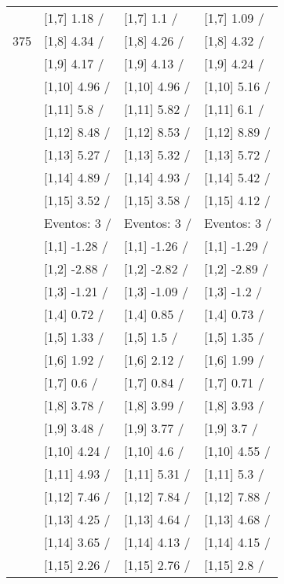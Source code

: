 \begin{table}
\begin{tabular}[t]{llll}
 & {}[1,7] 1.18  / & {}[1,7] 1.1  / & {}[1,7] 1.09  /\\
375 & {}[1,8] 4.34  / & {}[1,8] 4.26  / & {}[1,8] 4.32  /\\
\addlinespace
 & {}[1,9] 4.17  / & {}[1,9] 4.13  / & {}[1,9] 4.24  /\\
 & {}[1,10] 4.96  / & {}[1,10] 4.96  / & {}[1,10] 5.16  /\\
 & {}[1,11] 5.8  / & {}[1,11] 5.82  / & {}[1,11] 6.1  /\\
 & {}[1,12] 8.48  / & {}[1,12] 8.53  / & {}[1,12] 8.89  /\\
 & {}[1,13] 5.27  / & {}[1,13] 5.32  / & {}[1,13] 5.72  /\\
\addlinespace
 & {}[1,14] 4.89  / & {}[1,14] 4.93  / & {}[1,14] 5.42  /\\
 & {}[1,15] 3.52  / & {}[1,15] 3.58  / & {}[1,15] 4.12  /\\
 & Eventos:  3 / & Eventos:  3 / & Eventos:  3 /\\
 & {}[1,1] -1.28  / & {}[1,1] -1.26  / & {}[1,1] -1.29  /\\
 & {}[1,2] -2.88  / & {}[1,2] -2.82  / & {}[1,2] -2.89  /\\
\addlinespace
 & {}[1,3] -1.21  / & {}[1,3] -1.09  / & {}[1,3] -1.2  /\\
 & {}[1,4] 0.72  / & {}[1,4] 0.85  / & {}[1,4] 0.73  /\\
 & {}[1,5] 1.33  / & {}[1,5] 1.5  / & {}[1,5] 1.35  /\\
 & {}[1,6] 1.92  / & {}[1,6] 2.12  / & {}[1,6] 1.99  /\\
 & {}[1,7] 0.6  / & {}[1,7] 0.84  / & {}[1,7] 0.71  /\\
\addlinespace
500 & {}[1,8] 3.78  / & {}[1,8] 3.99  / & {}[1,8] 3.93  /\\
 & {}[1,9] 3.48  / & {}[1,9] 3.77  / & {}[1,9] 3.7  /\\
 & {}[1,10] 4.24  / & {}[1,10] 4.6  / & {}[1,10] 4.55  /\\
 & {}[1,11] 4.93  / & {}[1,11] 5.31  / & {}[1,11] 5.3  /\\
 & {}[1,12] 7.46  / & {}[1,12] 7.84  / & {}[1,12] 7.88  /\\
\addlinespace
 & {}[1,13] 4.25  / & {}[1,13] 4.64  / & {}[1,13] 4.68  /\\
 & {}[1,14] 3.65  / & {}[1,14] 4.13  / & {}[1,14] 4.15  /\\
 & {}[1,15] 2.26  / & {}[1,15] 2.76  / & {}[1,15] 2.8  /\\
\bottomrule
\end{tabular}
\end{table}
